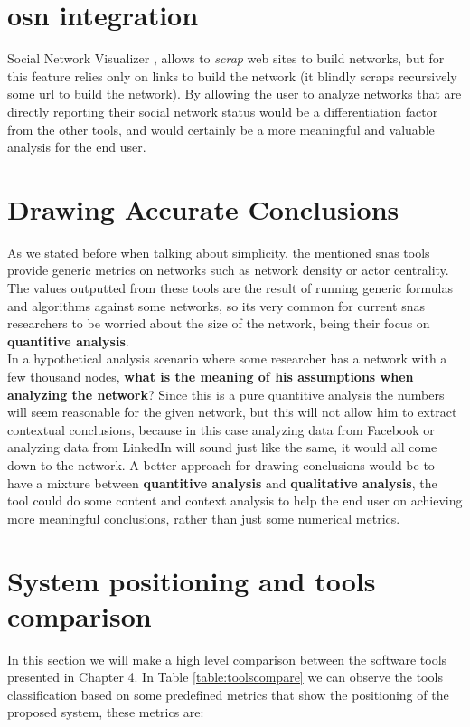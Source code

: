 \section{\acrfull{osn} integration}
Social Network Visualizer \citep{socnetv}, allows to \textit{scrap} web sites to build networks, but for this feature relies only on links to build the network (it blindly scraps recursively some url to build the network). By allowing the user to analyze networks that are directly reporting their social network status would be a differentiation factor from the other tools, and would certainly be a more meaningful and valuable analysis for the end user.

\section{Drawing Accurate Conclusions}
As we stated before when talking about simplicity, the mentioned \glspl{sna} tools provide generic metrics on networks such as network density or actor centrality. The values outputted from these tools are the result of running generic formulas and algorithms against some networks, so its very common for current \glspl{sna} researchers to be worried about the size of the network, being their focus on \textbf{quantitive analysis}.\\
\indent In a hypothetical analysis scenario where some researcher has a network with a few thousand nodes, \textbf{what is the meaning of his assumptions when analyzing the network}? Since this is a pure quantitive analysis the numbers will seem reasonable for the given network, but this will not allow him to extract contextual conclusions, because in this case analyzing data from Facebook or analyzing data from LinkedIn will sound just like the same, it would all come down to the network. A better approach for drawing conclusions would be to have a mixture between \textbf{quantitive analysis} and \textbf{qualitative analysis}, the tool could do some content and context analysis to help the end user on achieving more meaningful conclusions, rather than just some numerical metrics.

\section{System positioning and tools comparison}
In this section we will make a high level comparison between the software tools presented in Chapter 4. In Table \ref{table:toolscompare} we can observe the tools classification based on some predefined metrics that show the positioning of the proposed system, these metrics are:

